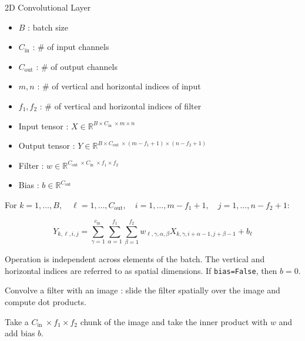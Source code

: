 \begin{frame}[allowframebreaks]

\begin{mydefinitionblock}{5.3}{2D Convolutional Layer}
    \begin{itemize}
        \item $B$ : batch size
        \item $C_{\text{in}}$ : \# of input channels
        \item $C_{\text{out}}$ : \# of output channels
        \item $m, n$ : \# of vertical and horizontal indices of input
        \item $f_1, f_2$ : \# of vertical and horizontal indices of filter
    \end{itemize}

    \par\noindent\textcolor{gray}{\hdashrule{\textwidth}{0.4pt}{1pt 2pt}}

    \begin{itemize}
        \item Input tensor : $X \in \mathbb{R}^{B \times C_{\text {in }} \times m \times n}$
        \item Output tensor : $Y \in \mathbb{R}^{B \times C_{\text {out }} \times\left(m-f_{1}+1\right) \times\left(n-f_{2}+1\right)}$
        \item Filter : $w \in \mathbb{R}^{C_{\text {out }} \times C_{\text {in }} \times f_{1} \times f_{2}}$
        \item Bias : $b \in \mathbb{R}^{C_{\text{out}}}$
    \end{itemize}

    \par\noindent\textcolor{gray}{\hdashrule{\textwidth}{0.4pt}{1pt 2pt}}

    For $k = 1, \dots, B, \quad \ell = 1, \dots, C_{\text{out}}, \quad i = 1, \dots, m-f_1+1, \quad j = 1, \dots, n-f_2+1$:

    $$
    Y_{k, \ell, i, j}=\sum_{\gamma=1}^{c_{\text {in }}} \sum_{\alpha=1}^{f_{1}} \sum_{\beta=1}^{f_{2}} w_{\ell, \gamma, \alpha, \beta} X_{k, \gamma, i+\alpha-1, j+\beta-1}+b_{\ell}
    $$

    Operation is independent across elements of the batch.
    The vertical and horizontal indices are referred to as spatial dimensions.
    If \verb|bias=False|, then $b=0$.

    \par\noindent\textcolor{gray}{\hdashrule{\textwidth}{0.4pt}{1pt 2pt}}

    Convolve a filter with an image : slide the filter spatially over the image and compute dot products.

    Take a $C_{\text {in }} \times f_{1} \times f_{2}$ chunk of the image and take the inner product with $w$ and add bias $b$.
\end{mydefinitionblock}

\end{frame}

